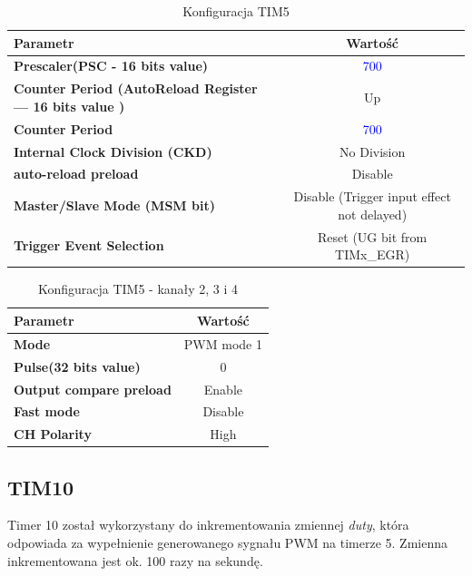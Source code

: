 \documentclass[10pt, a4paper]{article}
\begin{document}
\begin{table}[H]
    \centering
    \begin{tabular}{|l|c|} \hline
        \textbf{Parametr} & Wartość \\
        \hline
        \hline  \textbf{Prescaler(PSC - 16 bits value) }& \textcolor{blue}{700} \\
        \hline  \textbf{Counter Period (AutoReload Register --- 16 bits value )} & Up \\
        \hline  \textbf{Counter Period} & \textcolor{blue}{700} \\
        \hline  \textbf{Internal Clock Division (CKD) } & No Division\\
        \hline  \textbf{auto-reload preload} & Disable\\
        \hline  \textbf{Master/Slave Mode (MSM bit) } & Disable (Trigger input effect not delayed)
        \\
    \hline  \textbf{Trigger Event Selection} & Reset (UG bit from TIMx\_EGR)  \\
    \hline
 
    \end{tabular}
    \caption{Konfiguracja TIM5}
    \label{tab:TIM5}
\end{table}
 
\begin{table}[H]
    \centering
    \begin{tabular}{|l|c|} \hline
    \textbf{Parametr} & Wartość \\
    \hline
    \hline  \textbf{Mode} & PWM mode 1 \\
    \hline  \textbf{Pulse(32 bits value)} & 0 \\
    \hline  \textbf{Output compare preload} & Enable \\
    \hline  \textbf{Fast mode} & Disable \\
    \hline  \textbf{CH Polarity} & High \\
    \hline
    \end{tabular}
    \caption{Konfiguracja TIM5 - kanały 2, 3 i 4}
    \label{tab:CHANNELS}
\end{table}
\newpage
\subsection{TIM10}
Timer 10 został wykorzystany do inkrementowania zmiennej \emph{duty}, która odpowiada za wypełnienie generowanego sygnału PWM na timerze 5. Zmienna inkrementowana jest ok. 100 razy na sekundę.
 
\end{document}
